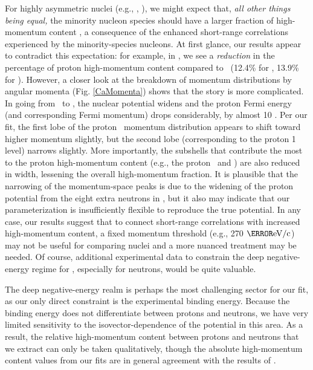 For highly asymmetric
nuclei (e.g., \snFour, \pbEight), we might expect that, \textit{all other things
being equal,} the minority nucleon species should have a
larger fraction of high-momentum content \cite{Subedi2008, Hen2012},
a consequence of the enhanced
short-range correlations experienced by the minority-species nucleons. At first
glance, our results appear to contradict this expectation: for example, in \caEight, we see a
\textit{reduction} in the percentage of proton
high-momentum content compared to \caForty\ (12.4\% for \caEight,
13.9\% for \caForty). However, a closer look at
the breakdown of momentum distributions by angular momenta (Fig.
\ref{CaMomenta}) shows that the story is more complicated. In going from
\caForty\ to \caEight, the nuclear potential widens and
the proton Fermi energy (and corresponding Fermi momentum) drops considerably,
by almost 10 \mega\electronvolt. Per our fit, the first lobe
of the proton \sOne\ momentum distribution appears to shift toward higher
momentum slightly, but the second lobe (corresponding to the proton 1\sOne
level) narrows slightly. More importantly, the subshells that contribute
the most to the proton high-momentum content
(e.g., the proton \dFive\ and \fSeven) are also reduced in width, lessening the
overall high-momentum fraction. It is plausible that the narrowing of the
momentum-space peaks is due to the widening of the proton potential
from the eight extra neutrons in \caEight, but it also may indicate that our
parameterization is insufficiently flexible to reproduce the true potential. In any
case, our results suggest that to connect
short-range correlations with increased high-momentum content,
a fixed momentum threshold (e.g., 270 $\mega\electronvolt/\text{c}$) may not be
useful for comparing nuclei and a more nuanced treatment may be needed.
Of course, additional experimental data to constrain the deep negative-energy
regime for \caEight, especially for neutrons, would be quite valuable.

The deep negative-energy realm is perhaps the most challenging sector for our fit,
as our only direct constraint is the experimental binding energy. Because the
binding energy does not differentiate between protons and neutrons, we have
very limited sensitivity to the isovector-dependence of the potential in
this area. As a result, the relative high-momentum content between protons and
neutrons that we extract can only be taken qualitatively, though the absolute
high-momentum content values from our fits are in general agreement with the
results of \cite{Rohe2004, RoheHabilitation}.

